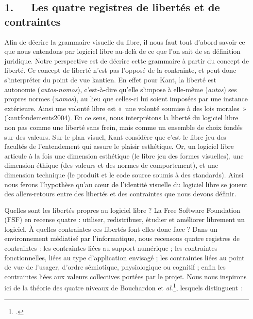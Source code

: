 \documentclass{FramateX}
\begin{document}
\begin{refsection}
\section*{1.~~~Les quatre registres de libertés et de contraintes}
{}


Afin de décrire la grammaire visuelle du libre, il nous faut tout
d'abord savoir ce que nous entendons par logiciel libre au-delà de ce
que l'on sait de sa définition juridique. Notre perspective est de
décrire cette grammaire à partir du concept de liberté. Ce concept de
liberté n'est pas l'opposé de la contrainte, et peut donc s'interpréter
du point de vue kantien. En effet pour Kant, la liberté est autonomie
(\textit{autos-nomos}), c'est-à-dire qu'elle s'impose à elle-même
(\textit{autos}) ses propres normes (\textit{nomos}), au lieu que celles-ci
lui soient imposées par une instance extérieure. Ainsi une volonté
libre est «~une volonté soumise à des lois morales~» ({kantfondements2004}).
En ce sens, nous interprétons la liberté du logiciel libre non pas
comme une liberté sans frein, mais comme un ensemble de choix fondés
sur des valeurs. Sur le plan visuel, Kant considère que c'est le libre
jeu des facultés de l'entendement qui assure le plaisir esthétique. Or,
un logiciel libre articule à la fois une dimension esthétique (le libre
jeu des formes visuelles), une dimension éthique (des valeurs et des
normes de comportement), et une dimension technique (le produit et le
code source soumis à des standards). Ainsi nous ferons l'hypothèse
qu'au cœur de l'identité visuelle du logiciel libre se jouent des
allers{}-retours entre des libertés et des contraintes que nous devons
définir. 

Quelles sont les libertés propres au logiciel libre ? La Free
Software Foundation (FSF) en recense quatre : utiliser, redistribuer,
étudier et améliorer librement un logiciel. À quelles contraintes ces
libertés font-elles donc face ? Dans un environnement médiatisé par
l'informatique, nous recensons quatre registres de contraintes : les
contraintes liées au support numérique ; les contraintes
fonctionnelles, liées au type d'application envisagé ; les contraintes
liées au point de vue de l'usager, d'ordre sémiotique, physiologique ou
cognitif ; enfin les contraintes liées aux valeurs collectives portées
par le projet. Nous nous inspirons ici de la théorie des quatre niveaux
de Bouchardon et \textit{al.}\footnote{\cite{bouchardonexplorer2011}.}, lesquels distinguent : 


\end{refsection}
\end{document}
